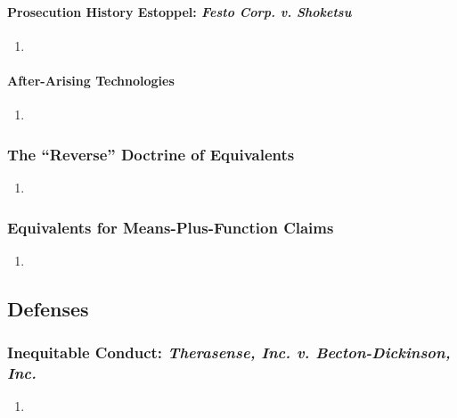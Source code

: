 \paragraph{Prosecution History Estoppel: \emph{Festo Corp. v. Shoketsu}} %

\begin{enumerate}
    \item 
\end{enumerate}

\paragraph{After-Arising Technologies} %

\begin{enumerate}
    \item 
\end{enumerate}

\subsubsection{The ``Reverse'' Doctrine of Equivalents} %

\begin{enumerate}
    \item 
\end{enumerate}

\subsubsection{Equivalents for Means-Plus-Function Claims} %

\begin{enumerate}
    \item 
\end{enumerate}

\subsection{Defenses}

\subsubsection{Inequitable Conduct: \emph{Therasense, Inc. v. Becton-Dickinson, 
Inc.}} %

\begin{enumerate}
    \item 
\end{enumerate}

